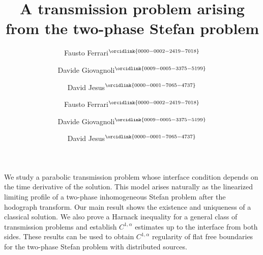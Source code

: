 \documentclass[12pt]{article}
\numberwithin{Theorem}{section}
\theoremstyle{definition}
\theoremstyle{remark}
\numberwithin{equation}{section}
\begin{document}
\title{A transmission problem arising from the two-phase Stefan problem} 


\author{Fausto Ferrari$^{\orcidlink{0000-0002-2419-7018}}$
  \and
  Davide Giovagnoli$^{\orcidlink{0009-0005-3375-5199}}$
  \and 
  David Jesus$^{\orcidlink{0000-0001-7065-4737}}$
} 


\author{Fausto Ferrari$^{\orcidlink{0000-0002-2419-7018}}$
\and 
Davide Giovagnoli$^{\orcidlink{0009-0005-3375-5199}}$
\and
David Jesus$^{\orcidlink{0000-0001-7065-4737}}$
}
\newcommand{\Addresses}{{
  \bigskip
  \footnotesize

  Fausto Ferrari, \textsc{Dipartimento di Matematica,
Universit\`a di Bologna\\ 
Piazza di Porta San Donato 5, 40126 Bologna, Italy}\par\nopagebreak
  \textit{E-mail address:} {\tt fausto.ferrari@unibo.it}\\


  \medskip

    Davide Giovagnoli, \textsc{Dipartimento di Matematica,
Universit\`a di Bologna\\ 
Piazza di Porta San Donato 5, 40126 Bologna, Italy}\par\nopagebreak
  \textit{E-mail address:} {\tt d.giovagnoli@unibo.it}\\

  \medskip

     David Jesus, \textsc{Applied Mathematics and Computational Sciences (AMCS), King
Abdullah University of Science and Technology (KAUST),  Thuwal 23955-6900, Kingdom of Saudi Arabia}\par\nopagebreak
  \textit{E-mail address:} {\tt djbj1993@gmail.com} \\
 }
}

\date{}

\maketitle

We study a parabolic transmission problem whose interface condition depends on the time derivative of the solution. This model arises naturally as the linearized limiting profile of a two-phase inhomogeneous Stefan problem after the hodograph transform. Our main result shows the existence and uniqueness of a classical solution. We also prove a Harnack inequality for a general class of transmission problems and establish \(C^{1,\alpha}\) estimates up to the interface from both sides. These results can be used to obtain \(C^{1,\alpha}\) regularity of flat free boundaries for the two-phase Stefan problem with distributed sources. 
\end{document}

